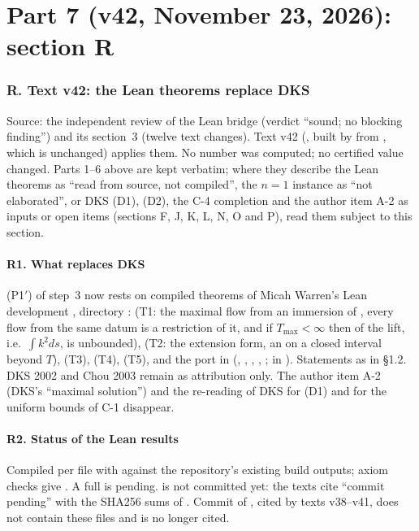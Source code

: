 \part*{Part 7 (v42, November 23, 2026): section R}
\section*{R. Text v42: the Lean theorems replace DKS}
Source: the independent review of the Lean bridge  (verdict ``sound; no blocking finding'') and its section~3 (twelve text changes). Text v42 (, built by  from , which is unchanged) applies them. No number was computed; no certified value changed. Parts 1--6 above are kept verbatim; where they describe the Lean theorems as ``read from source, not compiled'', the $n=1$ instance as ``not elaborated'', or DKS (D1), (D2), the C-4 completion and the author item A-2 as inputs or open items (sections F, J, K, L, N, O and P), read them subject to this section.
\subsection*{R1. What replaces DKS}
(P1$'$) of step~3 now rests on compiled theorems of Micah Warren's Lean development , directory :  (T1: the maximal flow from an immersion of , every flow from the same datum is a restriction of it, and if $T_{\max}<\infty$ then  of the lift, i.e.\ $\int k^2ds$, is unbounded),  (T2: the extension form, an  on a closed interval beyond $T$),  (T3),  (T4),  (T5), and the port in  (, , , , ;  in ). Statements as in  \S1.2. DKS 2002 and Chou 2003 remain as attribution only. The author item A-2 (DKS's ``maximal solution'') and the re-reading of DKS for (D1) and for the uniform bounds of C-1 disappear.
\subsection*{R2. Status of the Lean results}
Compiled per file with  against the repository's existing build outputs; axiom checks give . A full  is pending.  is not committed yet: the texts cite ``commit pending'' with the SHA256 sums of . Commit  of , cited by texts v38--v41, does not contain these files and is no longer cited.
